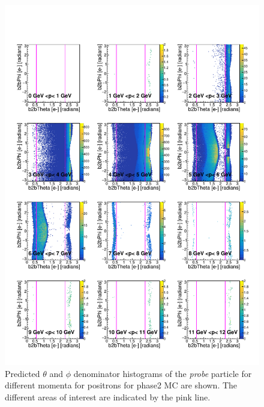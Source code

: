\documentclass[a4paper,11pt,twosided,final,german,openbib,pdftex,listof=totoc,bibliography=totoc]{scrbook}
\begin{document}
\begin{appendix}
\begin{figure}[h!]
	\includegraphics[width=\textwidth]{Plots/RTPMepD_MC.pdf}
	\caption[Denominator $\theta$, $\phi$ Positron Momentum MC]{Predicted $\theta$ and $\phi$ denominator histograms of the \textit{probe} particle for different momenta for positrons for phase2 MC are shown. The different areas of interest are indicated by the pink line.}
	\label{plt:RTPMepD_MC}
\end{figure}




\end{appendix}
\end{document}
